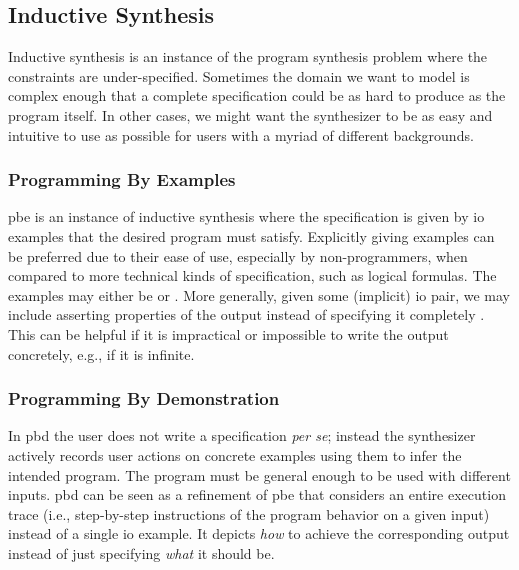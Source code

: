 \subsection{Inductive Synthesis}
\label{sec:inductive}


Inductive synthesis is an instance of the program synthesis problem where the
constraints are under-specified. Sometimes the domain we want to model is
complex enough that a complete specification could be as hard to produce as the
program itself. In other cases, we might want the synthesizer to be as easy and
intuitive to use as possible for users with a myriad of different backgrounds.

\subsubsection{Programming By Examples}

\Gls{pbe} is an instance of inductive synthesis where the specification is given
by \gls{io} examples that the desired program must satisfy. Explicitly giving
examples can be preferred due to their ease of use, especially by
non-programmers, when compared to more technical kinds of specification, such as
logical formulas. The examples may either be  or . More generally, given some
(implicit) \gls{io} pair, we may include asserting properties of the output
instead of specifying it completely \cite{Gulwani2017, Polozov:2015:FFI}. This
can be helpful if it is impractical or impossible to write the output concretely,
e.g., if it is infinite.

\subsubsection{Programming By Demonstration}


In \gls{pbd} the user does not write a specification \textit{per se}; instead the
synthesizer actively records user actions on concrete examples using them to
infer the intended program. The program must be general enough to be used
with different inputs. \gls{pbd} can be seen as a refinement of \gls{pbe} that
considers an entire execution trace (i.e., step-by-step instructions of the
program behavior on a given input) instead of a single \gls{io} example. It
depicts \textit{how} to achieve the corresponding output instead of just
specifying \textit{what} it should be.

